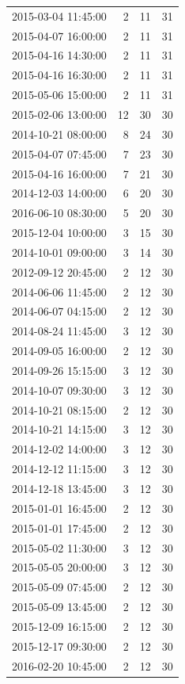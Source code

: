 \begin{tabular}{lrrr}
2015-03-04 11:45:00 & 2 & 11 & 31 \\
2015-04-07 16:00:00 & 2 & 11 & 31 \\
2015-04-16 14:30:00 & 2 & 11 & 31 \\
2015-04-16 16:30:00 & 2 & 11 & 31 \\
2015-05-06 15:00:00 & 2 & 11 & 31 \\
2015-02-06 13:00:00 & 12 & 30 & 30 \\
2014-10-21 08:00:00 & 8 & 24 & 30 \\
2015-04-07 07:45:00 & 7 & 23 & 30 \\
2015-04-16 16:00:00 & 7 & 21 & 30 \\
2014-12-03 14:00:00 & 6 & 20 & 30 \\
2016-06-10 08:30:00 & 5 & 20 & 30 \\
2015-12-04 10:00:00 & 3 & 15 & 30 \\
2014-10-01 09:00:00 & 3 & 14 & 30 \\
2012-09-12 20:45:00 & 2 & 12 & 30 \\
2014-06-06 11:45:00 & 2 & 12 & 30 \\
2014-06-07 04:15:00 & 2 & 12 & 30 \\
2014-08-24 11:45:00 & 3 & 12 & 30 \\
2014-09-05 16:00:00 & 2 & 12 & 30 \\
2014-09-26 15:15:00 & 3 & 12 & 30 \\
2014-10-07 09:30:00 & 3 & 12 & 30 \\
2014-10-21 08:15:00 & 2 & 12 & 30 \\
2014-10-21 14:15:00 & 3 & 12 & 30 \\
2014-12-02 14:00:00 & 3 & 12 & 30 \\
2014-12-12 11:15:00 & 3 & 12 & 30 \\
2014-12-18 13:45:00 & 3 & 12 & 30 \\
2015-01-01 16:45:00 & 2 & 12 & 30 \\
2015-01-01 17:45:00 & 2 & 12 & 30 \\
2015-05-02 11:30:00 & 3 & 12 & 30 \\
2015-05-05 20:00:00 & 3 & 12 & 30 \\
2015-05-09 07:45:00 & 2 & 12 & 30 \\
2015-05-09 13:45:00 & 2 & 12 & 30 \\
2015-12-09 16:15:00 & 2 & 12 & 30 \\
2015-12-17 09:30:00 & 2 & 12 & 30 \\
2016-02-20 10:45:00 & 2 & 12 & 30 \\

\end{tabular}
